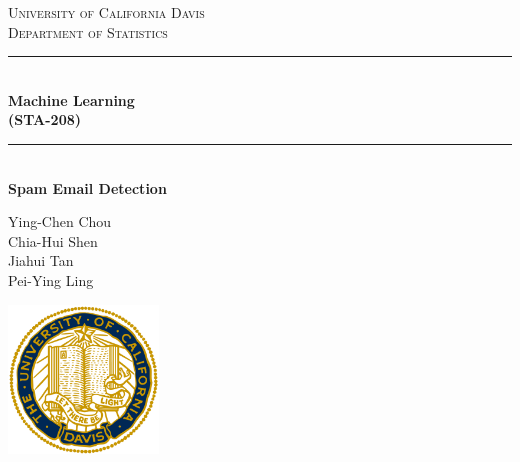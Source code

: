 \documentclass[12pt]{article}
\begin{document}
\begin{titlepage}

\newcommand{\HRule}{\rule{\linewidth}{0.5mm}} %

\center %
 

\textsc{\LARGE University of California Davis }\\[0.3cm] 
\textsc{\Large Department of Statistics}\\[0.5cm] 


\HRule \\[0.4cm]
{ \huge \bfseries Machine Learning\\  (STA-208)}\\[0.03cm]
\HRule \\[1.5cm]

\hfill \break \hfill \break \hfill \break
{ \huge \bfseries Spam Email Detection}\\
\hfill \break \hfill \break \hfill \break
\hfill \break

{\large Ying-Chen Chou  \\ 
        Chia-Hui Shen   \\
        Jiahui Tan      \\
        Pei-Ying Ling}  \\

\hfill \break

\includegraphics[width=4cm]{./plots/logo.png}\\[1cm] 


 

\vfill %

\end{titlepage}
\end{document}
